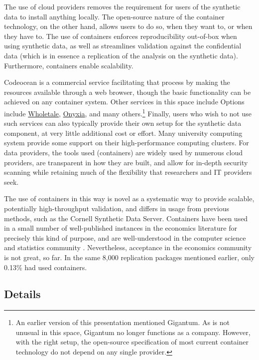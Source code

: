 \documentclass[]{hdsr}
\begin{document}
The use of cloud providers removes the requirement for users of the synthetic data to install anything locally. The open-source nature of the container technology, on the other hand, allows users to do so, when they want to, or when they have to. The use of containers enforces reproducibility out-of-box when using synthetic data, as well as streamlines validation against the confidential data (which is in essence a replication of the analysis on the synthetic data). Furthermore, containers enable scalability. 

Codeocean is a commercial service facilitating that process by making the resources available through a web browser, though the basic functionality can be achieved on any container system. Other services in this space include Options include \href{https://wholetale.org}{Wholetale}, \href{https://www.onyxia.sh/}{Onyxia}, and many others.\footnote{An earlier version of this presentation mentioned Gigantum. As is not unusual in this space, Gigantum no longer functions as a company. However, with the right setup, the open-source specification of most current container technology do not depend on any single provider.} Finally, users who wish to not use such services can also typically provide their own setup for the synthetic data component, at very little additional cost or effort. Many university computing system provide some support on their high-performance computing clusters. For data providers, the tools used (containers) are widely used by numerous cloud providers, are transparent in how they are built, and allow for in-depth security scanning while retaining much of the flexibility that researchers and IT providers seek.

The use of containers in this way is novel as a systematic way to provide scalable, potentially high-throughput validation, and differs in usage from previous methods, such as the Cornell Synthetic Data Server. Containers have been used in a small number of well-published instances in the economics literature for precisely this kind of purpose, and are well-understood in the computer science and statistics community \citep{boettiger_introduction_2015,moreau_containers_2023}. Nevertheless, acceptance in the economics community is not great, so far. In the same 8,000 replication packages mentioned earlier, only 0.13\% had used containers. 

\subsection{Details}
\end{document}
